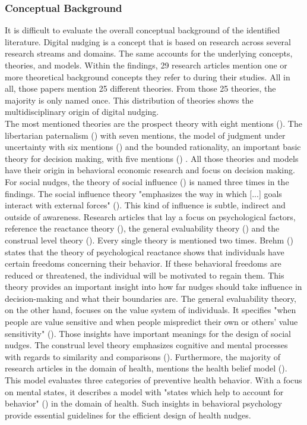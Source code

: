 \subsubsection{Conceptual Background} 
It is difficult to evaluate the overall conceptual background of the identified literature. Digital nudging is a concept that is based on research across several research streams and domains. The same accounts for the underlying concepts, theories, and models. Within the findings, 29 research articles mention one or more theoretical background concepts they refer to during their studies. All in all, those papers mention 25 different theories. From those 25 theories, the majority is only named once. This distribution of theories shows the multidisciplinary origin of digital nudging.
\\

The most mentioned theories are the prospect theory with eight mentions (\cite{kahneman_prospect_1979}). The libertarian paternalism (\cite{thaler_nudge:_2009}) with seven mentions, the model of judgment under uncertainty with six mentions (\cite{tversky_judgment_1974}) and the bounded rationality, an important basic theory for decision making, with five mentions (\cite{simon_behavioral_1955}) . All those theories and models have their origin in behavioral economic research and focus on decision making.
For social nudges, the theory of social influence (\cite{cialdini_social_2004}) is named three times in the findings. The social influence theory "emphasizes the way in which [...] goals interact with external forces" (\cite[p.591]{cialdini_social_2004}). This kind of influence is subtle, indirect and outside of awareness.
Research articles that lay a focus on psychological factors, reference the reactance theory (\cite{brehm_theory_1966}), the general evaluability theory (\cite{hsee_general_2010}) and the construal level theory (\cite{trope_construal-level_2010}). Every single theory is mentioned two times. Brehm (\citeyear{brehm_theory_1966}) states that the theory of psychological reactance shows that individuals have certain freedoms concerning their behavior. If these behavioral freedoms are reduced or threatened, the individual will be motivated to regain them. This theory provides an important insight into how far nudges should take influence in decision-making and what their boundaries are. The general evaluability theory, on the other hand, focuses on the value system of individuals. It specifies "when people are value sensitive and when people mispredict their own or others' value sensitivity" (\cite[p.343]{hsee_general_2010}). Those insights have important meanings for the design of social nudges. The construal level theory emphasizes cognitive and mental processes with regards to similarity and comparisons (\cite{trope_construal-level_2010}).
Furthermore, the majority of research articles in the domain of health, mentions the health belief model (\cite{rosenstock_health_1974}). This model evaluates three categories of preventive health behavior. With a focus on mental states, it describes a model with "states which help to account for behavior" (\cite[p.354]{rosenstock_health_1974}) in the domain of health. Such insights in behavioral psychology provide essential guidelines for the efficient design of health nudges. 


